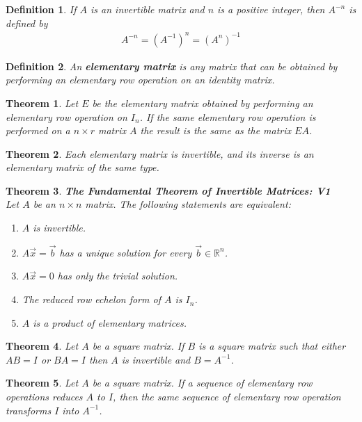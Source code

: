 \documentclass{article}
\theoremstyle{sltheorem}
\newtheorem{definition}{Definition}[section]
\newtheorem{theorem}{Theorem}[section]
\begin{document}
\begin{definition}
    If $A$ is an invertible matrix and $n$ is a positive integer, then $A^{-n}$ is defined by 
    \begin{gather*}
        A^{-n} = (A^{-1})^n = (A^n)^{-1}
    \end{gather*}
\end{definition}
\begin{definition}
    An \textbf{elementary matrix} is any matrix that can be obtained by performing an elementary row operation on an identity matrix. 
\end{definition}
\begin{theorem}
    Let $E$ be the elementary matrix obtained by performing an elementary row operation on $I_n$. If the same elementary row operation is performed on a $n\times r$ matrix $A$ the result is the same as the matrix $EA$.
\end{theorem}
\begin{theorem}
    Each elementary matrix is invertible, and its inverse is an elementary matrix of the same type.
\end{theorem}
\begin{theorem}
    \textbf{The Fundamental Theorem of Invertible Matrices: V1}\\
    Let $A$ be an $n\times n$ matrix. The following statements are equivalent:
    \begin{enumerate}
        \item $A$ is invertible.
        \item $A\vec x = \vec b$ has a unique solution for every $\vec b\in\mathbb{R}^n$.
        \item $A\vec x = 0$ has only the trivial solution.
        \item The reduced row echelon form of $A$ is $I_n$.
        \item $A$ is a product of elementary matrices.
    \end{enumerate}
\end{theorem}
\begin{theorem}
    Let $A$ be a square matrix. If $B$ is a square matrix such that either $AB=I$ or $BA=I$ then $A$ is invertible and $B=A^{-1}$.
\end{theorem}
\begin{theorem}
    Let $A$ be a square matrix. If a sequence of elementary row operations reduces $A$ to $I$, then the same sequence of elementary row operation transforms $I$ into $A^{-1}$.
\end{theorem}
\end{document}
